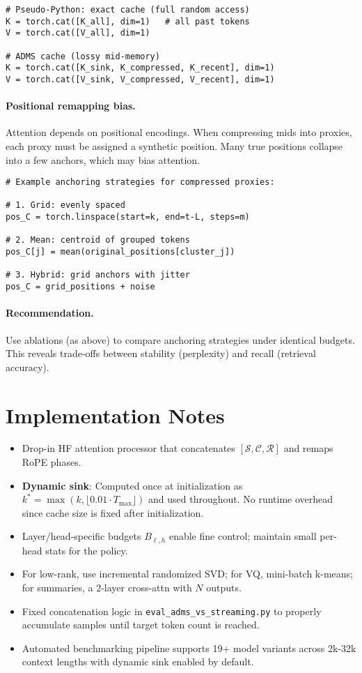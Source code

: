\documentclass[11pt]{article}
\newcommand{\sink}{\mathcal{S}}
\newcommand{\recent}{\mathcal{R}}
\newcommand{\compressed}{\mathcal{C}}
\begin{document}
\begin{verbatim}
# Pseudo-Python: exact cache (full random access)
K = torch.cat([K_all], dim=1)   # all past tokens
V = torch.cat([V_all], dim=1)

# ADMS cache (lossy mid-memory)
K = torch.cat([K_sink, K_compressed, K_recent], dim=1)
V = torch.cat([V_sink, V_compressed, V_recent], dim=1)
\end{verbatim}

\paragraph{Positional remapping bias.}
Attention depends on positional encodings. When compressing mids into proxies,
each proxy must be assigned a synthetic position. Many true positions collapse
into a few anchors, which may bias attention.

\begin{verbatim}
# Example anchoring strategies for compressed proxies:

# 1. Grid: evenly spaced
pos_C = torch.linspace(start=k, end=t-L, steps=m)

# 2. Mean: centroid of grouped tokens
pos_C[j] = mean(original_positions[cluster_j])

# 3. Hybrid: grid anchors with jitter
pos_C = grid_positions + noise
\end{verbatim}

\paragraph{Recommendation.}
Use ablations (as above) to compare anchoring strategies under identical
budgets. This reveals trade-offs between stability (perplexity) and recall
(retrieval accuracy).

\section{Implementation Notes}
\begin{itemize}
  \item Drop-in HF attention processor that concatenates $[\sink, \compressed, \recent]$ and remaps RoPE phases.
  \item \textbf{Dynamic sink}: Computed once at initialization as $k^* = \max(k, \lfloor 0.01 \cdot T_{\max}\rfloor)$ and used throughout. No runtime overhead since cache size is fixed after initialization.
  \item Layer/head-specific budgets $B_{\ell,h}$ enable fine control; maintain small per-head stats for the policy.
  \item For low-rank, use incremental randomized SVD; for VQ, mini-batch k-means; for summaries, a 2-layer cross-attn with $N$ outputs.
  \item Fixed concatenation logic in \texttt{eval\_adms\_vs\_streaming.py} to properly accumulate samples until target token count is reached.
  \item Automated benchmarking pipeline supports 19+ model variants across 2k-32k context lengths with dynamic sink enabled by default.
\end{itemize}
\end{document}
